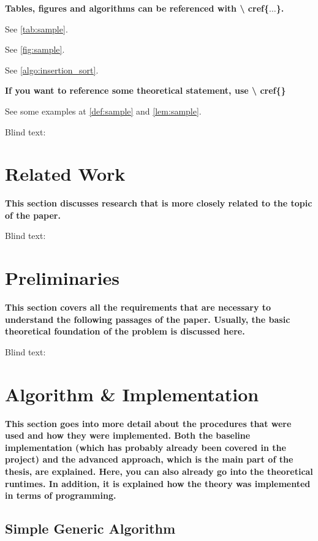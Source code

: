 \textbf{Tables, figures and algorithms can be referenced with \textbackslash
cref\{$\ldots$\}.}

See \cref{tab:sample}.

See \cref{fig:sample}.

See \cref{algo:insertion_sort}.

\textbf{If you want to reference some theoretical statement, use \textbackslash
cref\{\}}

See some examples at \cref{def:sample} and \cref{lem:sample}.

Blind text:

\lipsum[1-2]


\section{Related Work}
\label{sec:related_work}

\textbf{This section discusses research that is more closely related to the
topic of the paper.}

Blind text:

\lipsum[1-2]


\section{Preliminaries}
\label{sec:preliminaries}

\textbf{This section covers all the requirements that are necessary to
understand the following passages of the paper. Usually, the basic theoretical
foundation of the problem is discussed here.}

Blind text:

\lipsum[1-2]


\section{Algorithm \& Implementation}
\label{sec:algorithm_implementation}

\textbf{This section goes into more detail about the procedures that were used
and how they were implemented. Both the baseline implementation (which has
probably already been covered in the project) and the advanced approach, which
is the main part of the thesis, are explained. Here, you can also already go
into the theoretical runtimes. In addition, it is explained how the theory was
implemented in terms of programming. }

\subsection{Simple Generic Algorithm}
\label{subsec:simple_algo}

